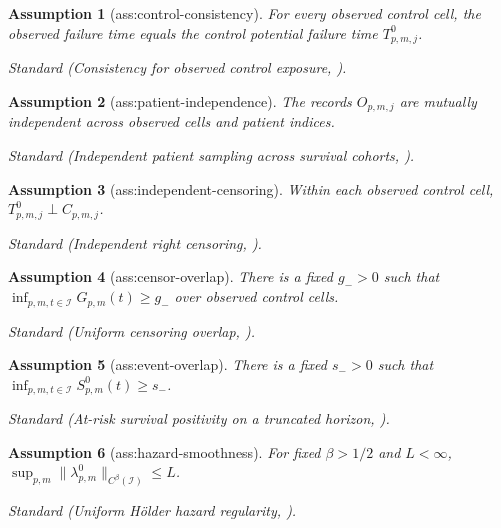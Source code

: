 \documentclass{article}
\newtheorem{assumption}{Assumption}
\begin{document}
\begin{assumption}[ass:control-consistency]\label{ass:control-consistency}
For every observed control cell, the observed failure time equals the control potential failure time \(T^0_{p,m,j}\).
\par\smallskip\noindent\emph{Standard} (Consistency for observed control exposure, \cite{HanShah2025SSC}).
\end{assumption}

\begin{assumption}[ass:patient-independence]\label{ass:patient-independence}
The records \(O_{p,m,j}\) are mutually independent across observed cells and patient indices.
\par\smallskip\noindent\emph{Standard} (Independent patient sampling across survival cohorts, \cite{KaplanMeier1958}).
\end{assumption}

\begin{assumption}[ass:independent-censoring]\label{ass:independent-censoring}
Within each observed control cell, \(T^0_{p,m,j}\perp C_{p,m,j}\).
\par\smallskip\noindent\emph{Standard} (Independent right censoring, \cite{KaplanMeier1958}).
\end{assumption}

\begin{assumption}[ass:censor-overlap]\label{ass:censor-overlap}
There is a fixed \(g_->0\) such that \(\inf_{p,m,t\in\mathcal I}G_{p,m}(t)\ge g_-\) over observed control cells.
\par\smallskip\noindent\emph{Standard} (Uniform censoring overlap, \cite{DoblerPaulyScheike2019}).
\end{assumption}

\begin{assumption}[ass:event-overlap]\label{ass:event-overlap}
There is a fixed \(s_->0\) such that \(\inf_{p,m,t\in\mathcal I}S^0_{p,m}(t)\ge s_-\).
\par\smallskip\noindent\emph{Standard} (At-risk survival positivity on a truncated horizon, \cite{DoblerPaulyScheike2019}).
\end{assumption}

\begin{assumption}[ass:hazard-smoothness]\label{ass:hazard-smoothness}
For fixed \(\beta>1/2\) and \(L<\infty\), \(\sup_{p,m}\|\lambda^0_{p,m}\|_{C^\beta(\mathcal I)}\le L\).
\par\smallskip\noindent\emph{Standard} (Uniform Hölder hazard regularity, \cite{AndersenBorganGillKeiding1993}).
\end{assumption}
\end{document}

